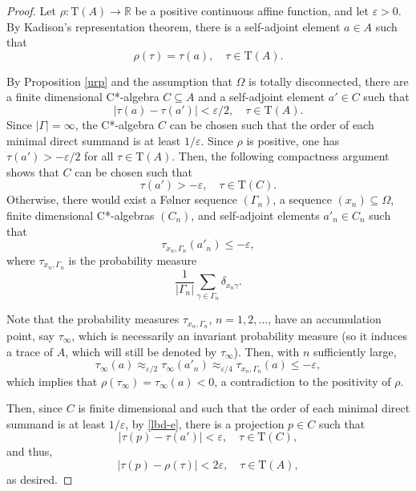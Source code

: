 \documentclass[12pt, oneside, psamsfonts]{amsart}
\theoremstyle{definition}
\theoremstyle{remark}
\numberwithin{equation}{section}
\newcommand{\abs}[1]{\left\vert#1\right\vert}
\newcommand{\Real}{\mathbb R}
\newcommand{\eps}{\varepsilon}
\newcommand{\tr}{\mathrm{T}}
\begin{document}
\begin{proof}
Let $\rho: \tr(A) \to \Real $ be a positive continuous affine function, and let $\eps>0$. By Kadison's representation theorem, there is a self-adjoint element $a \in A$ such that $$\rho(\tau) = \tau(a),\quad \tau \in \tr(A).$$

By Proposition \ref{urp} and the assumption that $\Omega$ is totally disconnected, there are a finite dimensional C*-algebra $C \subseteq A$ and a self-adjoint element  $a' \in C$ such that  $$\abs{\tau(a) - \tau(a')} < \eps/2, \quad \tau \in \tr(A).$$ Since $|\Gamma| = \infty$, the C*-algebra $C$ can be chosen such that the order of each minimal direct summand is at least $1/\eps$. Since $\rho$ is positive, one has $\tau(a') > -\eps/2$ for all $\tau\in \tr(A)$. Then, the following compactness argument shows that $C$ can be chosen such that 
\begin{equation}\label{lbd-e}
 \tau(a') > -\eps, \quad \tau \in \tr(C).
 \end{equation}
Otherwise, there would exist a F{\o}lner sequence $(\Gamma_n)$, a sequence $(x_n)  \subseteq \Omega$, finite dimensional C*-algebras $(C_n)$, and self-adjoint elements $a'_n \in C_n$ such that 
$$\tau_{x_n, \Gamma_n}(a'_n) \leq -\eps,$$
where $\tau_{x_n, \Gamma_n}$ is the probability measure
$$\frac{1}{\abs{\Gamma_n}}\sum_{\gamma \in \Gamma_n} \delta_{x_n \gamma}.$$

Note that the probability measures $ \tau_{x_n, \Gamma_n}$, $n=1, 2, ...$, have an accumulation point, say $\tau_\infty$, which is necessarily an invariant probability measure (so it induces a trace of $A$, which will still be denoted by $\tau_\infty$). Then, with $n$ sufficiently large, 
$$\tau_\infty(a) \approx_{\eps/2} \tau_\infty(a'_n) \approx_{\eps/4} \tau_{x_n, \Gamma_n}(a) \leq -\eps,$$
which implies that $\rho(\tau_\infty) = \tau_\infty(a) < 0$, a contradiction to the positivity of $\rho$.


Then, since $C$ is finite dimensional and such that the order of each minimal direct summand is at least $1/\eps$, by \eqref{lbd-e}, there is a projection $p \in C$ such that
$$\abs{\tau(p) - \tau(a')} < \eps, \quad \tau \in \tr(C),$$
and thus, $$ \abs{\tau(p) - \rho(\tau)} < 2\eps, \quad \tau \in \tr(A), $$
as desired.
\end{proof}
\end{document}
